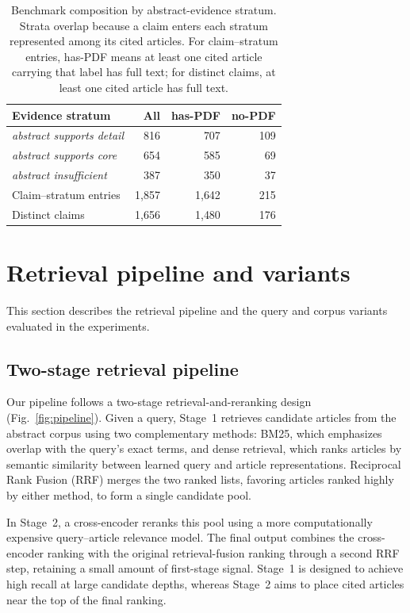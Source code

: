 \documentclass[runningheads]{llncs}
\begin{document}
\begin{table}[!htbp]
\centering
\caption{Benchmark composition by abstract-evidence stratum. Strata overlap
because a claim enters each stratum represented among its cited articles. For
claim--stratum entries, has-PDF means at least one cited article carrying that
label has full text; for distinct claims, at least one cited article has full
text.}
\label{tab:composition}
\setlength{\tabcolsep}{6pt}
\begin{tabular}{@{}lrrr@{}}
\toprule
Evidence stratum & All & has-PDF & no-PDF \\
\midrule
\emph{abstract supports detail} & 816 & 707 & 109 \\
\emph{abstract supports core}   & 654 & 585 &  69 \\
\emph{abstract insufficient}    & 387 & 350 &  37 \\
\midrule
Claim--stratum entries & 1{,}857 & 1{,}642 & 215 \\
Distinct claims        & 1{,}656 & 1{,}480 & 176 \\
\bottomrule
\end{tabular}
\end{table}

\FloatBarrier
\section{Retrieval pipeline and variants}
\label{sec:pipeline}

This section describes the retrieval pipeline and the query and corpus variants evaluated in the experiments.

\subsection{Two-stage retrieval pipeline}
\label{sec:two_stage_pipeline}
Our pipeline follows a two-stage retrieval-and-reranking design (Fig.~\ref{fig:pipeline}). Given a query, Stage~1 retrieves candidate articles from the abstract corpus using two complementary methods: BM25, which emphasizes overlap with the query's exact terms, and dense retrieval, which ranks articles by semantic similarity between learned query and article representations. Reciprocal Rank Fusion (RRF) merges the two ranked lists, favoring articles ranked highly by either method, to form a single candidate pool.

In Stage~2, a cross-encoder reranks this pool using a more computationally expensive query--article relevance model. The final output combines the cross-encoder ranking with the original retrieval-fusion ranking through a second RRF step, retaining a small amount of first-stage signal. Stage~1 is designed to achieve high recall at large candidate depths, whereas Stage~2 aims to place cited articles near the top of the final ranking.
\end{document}
